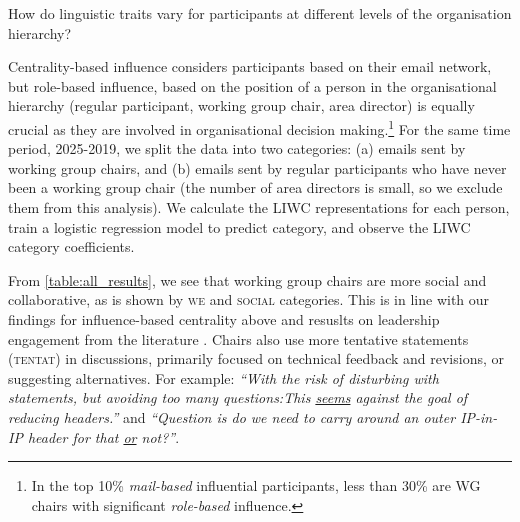 \documentclass[twocolumn,10pt]{article}
\newcommand{\pb}[1]{\vspace{0.75ex}\noindent{\textbf{#1}}}
\newcommand{\liwc}[1]{\textsc{#1}}
\begin{document}

\pb{Language and Organisational Role:}
How do linguistic traits vary for participants at different levels of the
organisation hierarchy? 

Centrality-based influence considers participants based on their email
network, but role-based influence, based on the position of a person in the
organisational hierarchy (regular participant, working group chair, area
director) is equally crucial as they are involved in organisational
decision making.\footnote{In the top 10\% \textit{mail-based} influential
participants, less than 30\% are WG chairs with significant
\textit{role-based} influence.} 
For the same time period, 2025-2019, we split the data into two categories:
(a) emails sent by working group chairs, and (b) emails sent by regular
participants who have never been a working group chair (the number of area
directors is small, so we exclude them from this analysis).  We calculate
the LIWC representations for each person, train a logistic regression model
to predict category, and observe the LIWC category coefficients.


From \ref{table:all_results}, we see that working group chairs are more
social and collaborative, as is shown by \liwc{we} and \liwc{social}
categories. This is in line with our findings for influence-based
centrality above and resuslts on leadership engagement from the literature
\cite{strzalkowski2012modeling, liu2022pronoun, kacewicz2014pronoun,
guinote2017power}.
Chairs also use more tentative statements (\liwc{tentat}) in discussions,
primarily focused on technical feedback and revisions, or suggesting
alternatives. For example:
\textit{``With the risk of disturbing with statements, but avoiding too
many questions:This \underline{seems} against the goal of reducing
headers.''} 
and
\textit{``Question is do we need to carry around an outer IP-in-IP header
for that \underline{or} not?''}.
\end{document}
